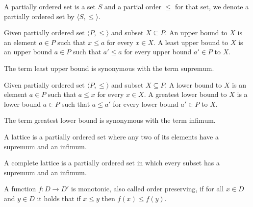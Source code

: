 \begin{definition}
	A partially ordered set is a set $S$ and a partial order $\leq$ for that set, we denote a partially ordered set by $\langle S, \leq \rangle$.
\end{definition}

\begin{definition}
	Given partially ordered set $\langle P,\leq \rangle$ and subset $X \subseteq P$. An upper bound to $X$ is an element $a \in P$ such that $x \leq a$ for every $x\in X$. A least upper bound to $X$ is an upper bound $a \in P$ such that $a' \leq a$ for every upper bound $a' \in P$ to $X$.  
	
	The term least upper bound is synonymous with the term supremum.
\end{definition}
\begin{definition}
	Given partially ordered set $\langle P,\leq \rangle$ and subset $X \subseteq P$. A lower bound to $X$ is an element $a \in P$ such that $a \leq x$ for every $x\in X$. A greatest lower bound to $X$ is a lower bound $a \in P$ such that $a \leq a'$ for every lower bound $a' \in P$ to $X$. 
	
	The term greatest lower bound is synonymous with the term infimum.
\end{definition}

\begin{definition}
	A lattice is a partially ordered set where any two of its elements have a supremum and an infimum.
\end{definition}

\begin{definition}
	A complete lattice is a partially ordered set in which every subset has a supremum and an infimum.
\end{definition}

\begin{definition}
	A function $f : D \rightarrow D'$ is monotonic, also called order preserving, if for all $x \in D$ and $y \in D$ it holds that if $x \leq y$ then $f(x) \leq f(y)$.
\end{definition}

